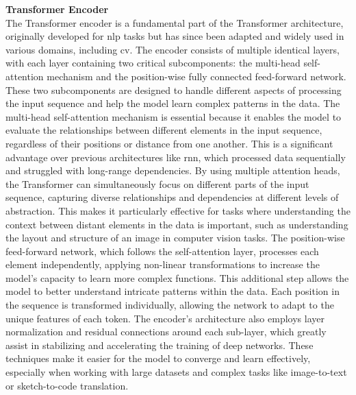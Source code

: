 \textbf{Transformer Encoder}\\
The Transformer encoder is a fundamental part of the Transformer architecture, originally developed for \gls{nlp} tasks but has since been adapted and widely used in various domains, including \gls{cv}. The encoder consists of multiple identical layers, with each layer containing two critical subcomponents: the multi-head self-attention mechanism and the position-wise fully connected feed-forward network. These two subcomponents are designed to handle different aspects of processing the input sequence and help the model learn complex patterns in the data.
The multi-head self-attention mechanism is essential because it enables the model to evaluate the relationships between different elements in the input sequence, regardless of their positions or distance from one another. This is a significant advantage over previous architectures like \gls{rnn}, which processed data sequentially and struggled with long-range dependencies. By using multiple attention heads, the Transformer can simultaneously focus on different parts of the input sequence, capturing diverse relationships and dependencies at different levels of abstraction. This makes it particularly effective for tasks where understanding the context between distant elements in the data is important, such as understanding the layout and structure of an image in computer vision tasks.
The position-wise feed-forward network, which follows the self-attention layer, processes each element independently, applying non-linear transformations to increase the model's capacity to learn more complex functions. This additional step allows the model to better understand intricate patterns within the data. Each position in the sequence is transformed individually, allowing the network to adapt to the unique features of each token. The encoder’s architecture also employs layer normalization and residual connections around each sub-layer, which greatly assist in stabilizing and accelerating the training of deep networks. These techniques make it easier for the model to converge and learn effectively, especially when working with large datasets and complex tasks like image-to-text or sketch-to-code translation.

